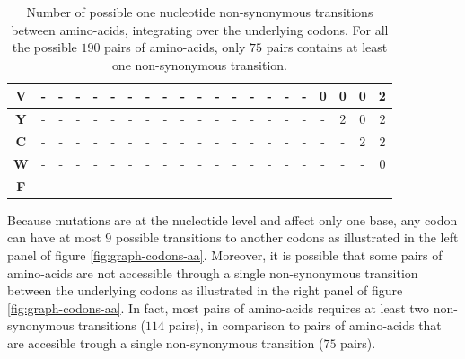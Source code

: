 \begin{table}[H]
{\begin{tabular}{|c||c|c|c|c|c|c|c|c|c|c|c|c|c|c|c|c|c|c|c|c|}
		\hline \textbf{V} & - & - & - & - & - & - & - & - & - & - & - & - & - & - & - & - & 0 & 0 & 0 & 2\\
		\hline \textbf{Y} & - & - & - & - & - & - & - & - & - & - & - & - & - & - & - & - & - & 2 & 0 & 2\\
		\hline \textbf{C} & - & - & - & - & - & - & - & - & - & - & - & - & - & - & - & - & - & - & 2 & 2\\
		\hline \textbf{W} & - & - & - & - & - & - & - & - & - & - & - & - & - & - & - & - & - & - & - & 0\\
		\hline \textbf{F} & - & - & - & - & - & - & - & - & - & - & - & - & - & - & - & - & - & - & - & -\\
		\hline
	\end{tabular}}
\caption[Amino-acids adjacency matrix]{
Number of possible one nucleotide non-synonymous transitions between amino-acids, integrating over the underlying codons.
For all the possible $190$ pairs of amino-acids, only $75$ pairs contains at least one non-synonymous transition.
}
\label{table:adjacency}
\end{table}
Because mutations are at the nucleotide level and affect only one base, any codon can have at most $9$ possible transitions to another codons as illustrated in the left panel of figure \ref{fig:graph-codons-aa}.
Moreover, it is possible that some pairs of amino-acids are not accessible through a single non-synonymous transition between the underlying codons as illustrated in the right panel of figure \ref{fig:graph-codons-aa}.
In fact, most pairs of amino-acids requires at least two non-synonymous transitions ($114$ pairs), in comparison to pairs of amino-acids that are accesible trough a single non-synonymous transition ($75$ pairs).

